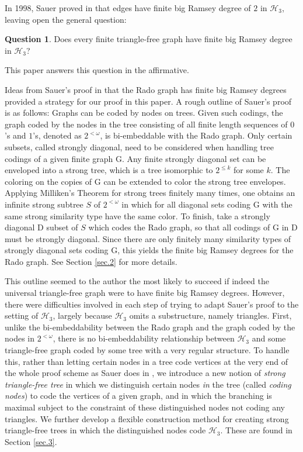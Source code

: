 \documentclass{amsart}
\theoremstyle{remark}
\theoremstyle{definition}
\newtheorem{question}[thm]{Question}
\theoremstyle{remark}
\newcommand{\om}{\omega}
\newcommand{\G}{\mathrm{G}}
\newcommand{\D}{\mathrm{D}}
\begin{document}
In 1998, Sauer proved in \cite{Sauer98} that edges  have  finite big Ramsey degree of $2$ in $\mathcal{H}_3$, leaving
 open the general question:


\begin{question}\label{q.fRd}
Does every finite triangle-free graph have finite big Ramsey degree in $\mathcal{H}_3$?
\end{question}


This paper answers this question in the affirmative.


Ideas from  Sauer's proof   in \cite{Sauer06}
that the Rado
 graph has finite big Ramsey degrees
provided  a strategy for our proof in this paper.
A rough outline of Sauer's proof is as follows:
Graphs can be coded by nodes on trees.
Given such codings, the graph coded by the nodes in
the tree consisting of all finite length sequences of $0$'s and $1$'s, denoted as
 $2^{<\om}$,
 is bi-embeddable with the Rado graph.
Only certain subsets, called strongly diagonal,  need to be considered when handling tree codings of a given finite graph $\G$.
Any finite strongly diagonal set can be enveloped into a strong tree, which is a tree isomorphic to $2^{\le k}$ for some $k$.
The coloring on the copies of $\G$ can be extended to color the strong tree envelopes.
Applying Milliken's Theorem  for strong trees  finitely many times, one obtains an infinite  strong subtree $S$  of $2^{<\om}$ in which for
all diagonal sets coding $\G$ with the same strong similarity type have the same color.
To finish,  take a strongly diagonal $\D$ subset of $S$ which codes the Rado graph, so that
all codings of $\G$ in $\D$ must be strongly diagonal.
Since there are only finitely many similarity types of strongly diagonal sets coding $\G$, this yields the finite big Ramsey degrees for the Rado graph.
See Section \ref{sec.2} for more details.



This outline seemed to the author the most likely to succeed if
indeed the universal triangle-free graph were to have finite  big Ramsey degrees.
However,
there were  difficulties involved  in each step  of trying to adapt Sauer's proof
 to the setting of $\mathcal{H}_3$,
largely because $\mathcal{H}_3$  omits a substructure, namely triangles.
First,
unlike the
 bi-embeddability between the Rado graph and the graph coded by the nodes in  $2^{<\om}$,
there is no bi-embeddability relationship between $\mathcal{H}_3$ and some
triangle-free graph coded by some
 tree with a  very regular  structure.
To handle this,
rather than letting certain nodes in a tree code vertices at the very end of the whole proof scheme as Sauer does in \cite{Sauer06},
we
 introduce a new notion of {\em strong triangle-free tree}
in which  we
 distinguish certain  nodes {\em in} the tree   (called {\em coding nodes})
to code the vertices of a given graph, and in which the branching is maximal subject to the constraint of  these distinguished nodes not coding any triangles.
We further develop a flexible construction method for creating   strong triangle-free trees in which the distinguished nodes code $\mathcal{H}_3$.
These are found in Section \ref{sec.3}.
\end{document}
